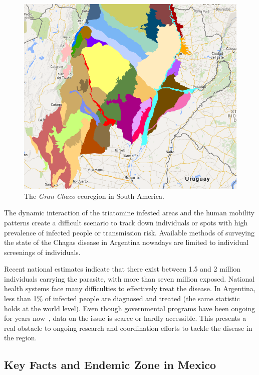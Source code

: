 \begin{figure}[h!]
\centering
\includegraphics[width=0.75\columnwidth]{figures/Ambientes_GranChaco_TNC-Argentina/Ambientes_GranChaco_TNC-Argentina.png}
\caption{The \textit{Gran Chaco} ecoregion in South America.%
}
\label{fig:granchaco}
\end{figure}


The dynamic interaction of the triatomine infested areas and the human mobility patterns create a difficult scenario to track down individuals or spots with high prevalence of infected people or transmission risk. Available methods of surveying the state of the Chagas disease in Argentina nowadays are limited to individual screenings of individuals. %

Recent national estimates indicate that there exist between 1.5 and 2 million individuals carrying the parasite, with more than seven million exposed. National health systems face many difficulties to effectively treat the disease. 
In Argentina, less than 1\% of infected people are diagnosed and treated 
(the same statistic holds at the world level).
Even though governmental programs have been ongoing for years now~\cite{plan_nacional_chagas}, data on the issue is scarce or hardly accessible. This presents a real obstacle to ongoing research and coordination efforts to tackle the disease in the region.


\subsection{Key Facts and Endemic Zone in Mexico} \label{endemic_zone_mexico}


